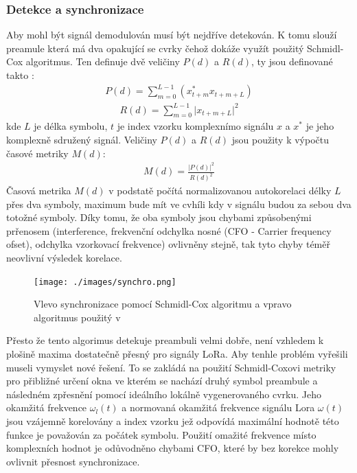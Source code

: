 \documentclass{ctuthesis}
\begin{document}
\subsubsection{Detekce a synchronizace}
\label{subsec:detection}
Aby mohl být signál demodulován musí být nejdříve detekován. K tomu slouží preamule která má dva opakující se cvrky čehož dokáže využít použitý Schmidl-Cox algoritmus. Ten definuje dvě veličiny $P(d)$ a $R(d)$, ty jsou definované takto \cite{schmidlcox1997}:
\begin{align}P(d) = \sum_{m=0}^{L-1} (x_{t+m}^{\ast}x_{t+m+L})
\label{eq:lora3}
\end{align}
\begin{align}
R(d) = \sum_{m=0}^{L-1} \lvert{x_{t+m+L}}\rvert^{2}
\label{eq:lora4}
\end{align}
kde $L$ je délka symbolu, $t$ je index vzorku komplexnímo signálu $x$ a $x^{\ast}$ je jeho komplexně sdružený signál. Veličiny $P(d)$ a $R(d)$ jsou použity k výpočtu časové metriky $M(d)$:
\begin{align}
M(d) = \frac{\vert P(d) \rvert ^{2}}{R(d)^{2}}
\label{eq:lora5}
\end{align}
Časová metrika $M(d)$ v podstatě počítá normalizovanou autokorelaci délky $L$ přes dva symboly, maximum bude mít ve cvhíli kdy v signálu budou za sebou dva totožné symboly. Díky tomu, že oba symboly jsou chybami způsobenými prřenosem (interference, frekvenční odchylka nosné (CFO - Carrier frequency ofset), odchylka vzorkovací frekvence) ovlivněny stejně, tak tyto chyby téměř neovlivní výsledek korelace. \\
\begin{figure}
\caption{Vlevo synchronizace pomocí Schmidl-Cox algoritmu a vpravo algoritmus použitý v \cite{gr-lora2018}}
\texttt{[image: ./images/synchro.png]}
\label{fig:loraSyn}
\end{figure}
Přesto že tento algorimus detekuje preambuli velmi dobře, není vzhledem k plošině maxima dostatečně přesný pro signály LoRa. Aby \cite{gr-lora2018} tenhle problém vyřešili museli vymyslet nové řešení. To se zakládá na použití Schmidl-Coxovi metriky pro přibližné určení okna ve kterém se nachází druhý symbol preambule a následném zpřesnění pomocí ideálního lokálně vygenerovaného cvrku. Jeho okamžitá frekvence $\omega_{l}(t)$ a normovaná okamžitá frekvence signálu Lora  $\omega(t)$ jsou vzájemně korelovány a index vzorku jež odpovídá maximální hodnotě této funkce je považován za počátek symbolu. Použití omažité frekvence místo komplexních hodnot je odůvodněno chybami CFO, které by bez korekce mohly ovlivnit přesnost synchronizace.
\end{document}
